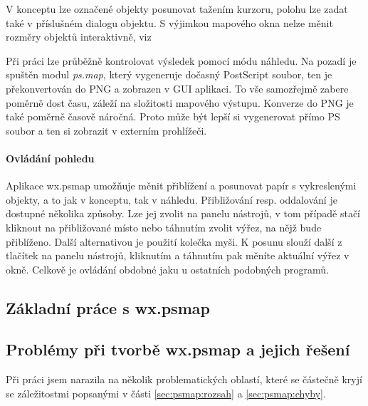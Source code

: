 \documentclass[a4paper,12pt,draft]{article}
\newcommand{\modul}[1]{\emph{#1}}
\begin{document}
V konceptu lze označené objekty posunovat tažením kurzoru, polohu lze zadat také v příslušném dialogu objektu. S výjimkou mapového okna nelze měnit rozměry objektů interaktivně, viz 

Při práci lze průběžně kontrolovat výsledek pomocí módu náhledu. Na pozadí je spuštěn modul \modul{ps.map}, který vygeneruje dočasný PostScript soubor, ten je překonvertován do PNG a zobrazen v GUI aplikaci. To vše samozřejmě zabere poměrně dost času, záleží na složitosti mapového výstupu. Konverze do PNG je také poměrně časově náročná. Proto může být lepší si vygenerovat přímo PS soubor a ten si zobrazit v externím prohlížeči.

\paragraph*{Ovládání pohledu}
Aplikace wx.psmap umožňuje měnit přiblížení a posunovat papír s vykreslenými objekty, a to jak v konceptu, tak v náhledu. Přibližování resp. oddalování je dostupné několika způsoby. Lze jej zvolit na panelu nástrojů, v tom případě stačí kliknout na přibližované místo nebo táhnutím zvolit výřez, na nějž bude přiblíženo. Další alternativou je použití kolečka myši. K posunu slouží další z tlačítek na panelu nástrojů, kliknutím a táhnutím pak měníte aktuální výřez v okně. Celkově je ovládání obdobné jaku u ostatních podobných programů.

\subsection{Základní práce s wx.psmap}

\subsection[Problémy při tvorbě wx.psmap]{Problémy při tvorbě wx.psmap a jejich řešení}
\label{sec:gui:problemy}
Při práci jsem narazila na několik problematických oblastí, které se částečně kryjí se záležitostmi popsanými v části \ref{sec:psmap:rozsah} a \ref{sec:psmap:chyby}. 
\end{document}
